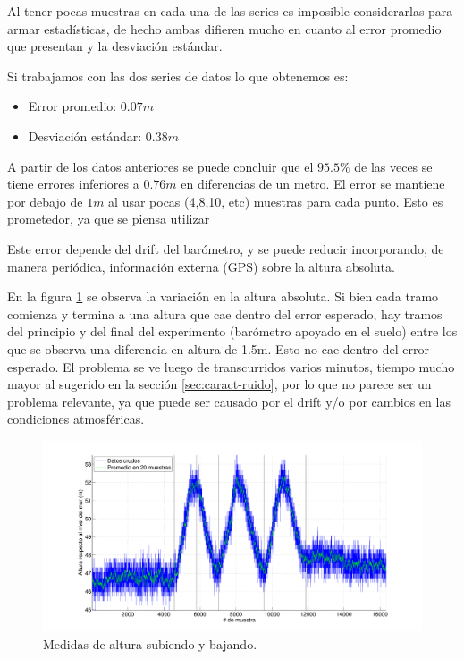\documentclass[spanish,12pt,a4paper,titlepage]{report}
\begin{document}
Al tener pocas muestras en cada una de las series es imposible considerarlas para armar estadísticas, de hecho ambas difieren mucho en cuanto al error promedio que presentan y la desviación estándar. 

Si trabajamos con las dos series de datos lo que obtenemos es:

\begin{itemize}
\item Error promedio: $0.07m$
\item Desviación estándar: $0.38m$
\end{itemize}

A partir de los datos anteriores se puede concluir que el $95.5 \%$ de las veces se tiene errores inferiores a $0.76m$ en diferencias de un metro. El error se mantiene por debajo de $1m$ al usar pocas (4,8,10, etc) muestras para cada punto. Esto es prometedor, ya que se piensa utilizar 

Este error depende del drift del barómetro, y se puede reducir incorporando, de manera periódica, información externa (GPS) sobre la altura absoluta.

En la figura \ref{fig:variando} se observa la variación en la altura absoluta. Si bien cada tramo comienza y termina a una altura que cae dentro del error esperado, hay tramos del principio y del final del experimento (barómetro apoyado en el suelo) entre los que se observa una diferencia en altura de 1.5m. Esto no cae dentro del error esperado. El problema se ve luego de transcurridos varios minutos, tiempo mucho mayor al sugerido en la sección \ref{sec:caract-ruido}, por lo que no parece ser un problema relevante, ya que puede ser causado por el drift y/o por cambios en las condiciones atmosféricas.

\begin{figure}[H]
\centering
  \includegraphics[width=1\textwidth]{./pics/variando.pdf}
  \caption{Medidas de altura subiendo y bajando.}
  \label{fig:variando}
\end{figure}
\end{document}
